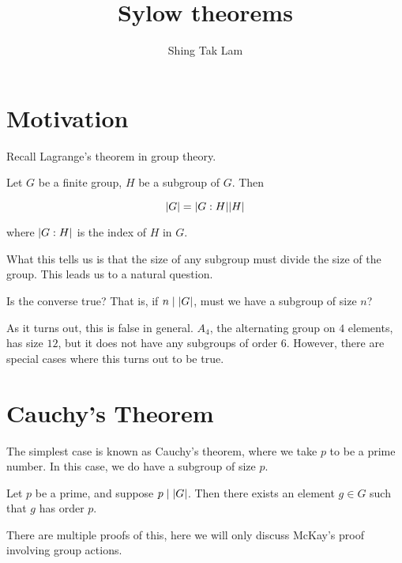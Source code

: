 \documentclass{article}
\title{Sylow theorems}
\author{Shing Tak Lam}
\begin{document}
    \maketitle

    \section{Motivation}

    Recall Lagrange's theorem in group theory.

    \begin{theorem*}

        Let $G$ be a finite group, $H$ be a subgroup of $G$. Then

        $$\abs{G} = \abs{G: H}\abs{H}$$

        where $\abs{G : H}$ is the index of $H$ in $G$.
    \end{theorem*}

    What this tells us is that the size of any subgroup must divide the size of the group. This leads us to a natural question.

    \begin{question*}
        Is the converse true? That is, if $n \mid \abs{G}$, must we have a subgroup of size $n$?
    \end{question*}

    As it turns out, this is false in general. $A_4$, the alternating group on $4$ elements, has size $12$, but it does not have any subgroups of order $6$. However, there are special cases where this turns out to be true.

    \section{Cauchy's Theorem}

    The simplest case is known as Cauchy's theorem, where we take $p$ to be a prime number. In this case, we do have a subgroup of size $p$.

    \begin{theorem*}

        Let $p$ be a prime, and suppose $p \mid \abs{G}$. Then there exists an element $g \in G$ such that $g$ has order $p$.
    \end{theorem*}

    There are multiple proofs of this, here we will only discuss McKay's proof involving group actions.
\end{document}
